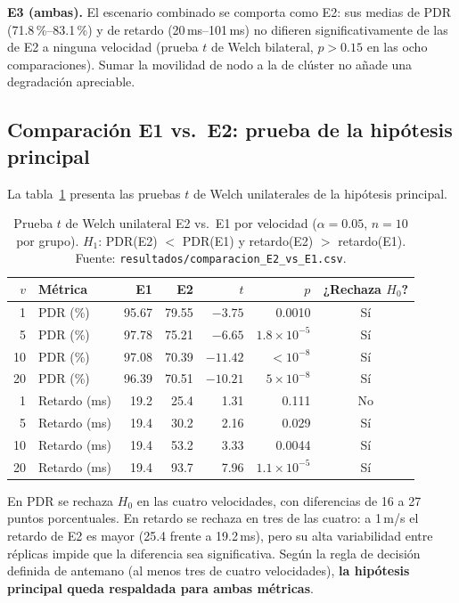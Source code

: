 \textbf{E3 (ambas).} El escenario combinado se comporta como E2: sus medias de PDR
(71.8\,\%--83.1\,\%) y de retardo (20\,ms--101\,ms) no difieren significativamente de las
de E2 a ninguna velocidad (prueba $t$ de Welch bilateral, $p > 0.15$ en las ocho
comparaciones). Sumar la movilidad de nodo a la de clúster no añade una degradación
apreciable.

\subsection{Comparación E1 vs.\ E2: prueba de la hipótesis principal}

La tabla~\ref{tab:welch} presenta las pruebas $t$ de Welch unilaterales
\cite{welch1947generalization} de la hipótesis principal.

\begin{table}[h]
\centering
\small
\begin{tabular}{rlrrrrc}
\toprule
\textbf{$v$} & \textbf{Métrica} & \textbf{E1} & \textbf{E2} & \textbf{$t$} &
\textbf{$p$} & \textbf{¿Rechaza $H_0$?} \\
\midrule
1  & PDR (\%)     & 95.67 & 79.55 & $-3.75$  & 0.0010              & Sí \\
5  & PDR (\%)     & 97.78 & 75.21 & $-6.65$  & $1.8\times10^{-5}$  & Sí \\
10 & PDR (\%)     & 97.08 & 70.39 & $-11.42$ & $<10^{-8}$          & Sí \\
20 & PDR (\%)     & 96.39 & 70.51 & $-10.21$ & $5\times10^{-8}$    & Sí \\
\midrule
1  & Retardo (ms) & 19.2  & 25.4  & 1.31     & 0.111               & No \\
5  & Retardo (ms) & 19.4  & 30.2  & 2.16     & 0.029               & Sí \\
10 & Retardo (ms) & 19.4  & 53.2  & 3.33     & 0.0044              & Sí \\
20 & Retardo (ms) & 19.4  & 93.7  & 7.96     & $1.1\times10^{-5}$  & Sí \\
\bottomrule
\end{tabular}
\caption{Prueba $t$ de Welch unilateral E2 vs.\ E1 por velocidad ($\alpha = 0.05$,
$n = 10$ por grupo). $H_1$: PDR(E2) $<$ PDR(E1) y retardo(E2) $>$ retardo(E1). Fuente:
\texttt{resultados/comparacion\_E2\_vs\_E1.csv}.}
\label{tab:welch}
\end{table}

En PDR se rechaza $H_0$ en las cuatro velocidades, con diferencias de 16 a 27 puntos
porcentuales. En retardo se rechaza en tres de las cuatro: a 1\,m/s el retardo de E2 es
mayor (25.4 frente a 19.2\,ms), pero su alta variabilidad entre réplicas impide que la
diferencia sea significativa. Según la regla de decisión definida de antemano (al menos
tres de cuatro velocidades), \textbf{la hipótesis principal queda respaldada para ambas
métricas}.

